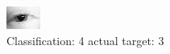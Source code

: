 \begin{figure}[h!]
\begin{center}
\includegraphics[width=0.60\columnwidth]{figures/ID134_class_4_target_3.png}
\end{center}
\caption{ Classification: 4 actual target: 3}
\label{fig:ID134_class_4_target_3}
\end{figure}
